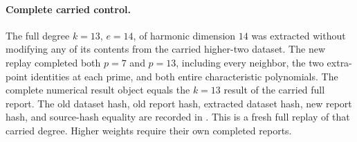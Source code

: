 \paragraph{Complete carried control.}
The full degree $k=13$, $e=14$, of harmonic dimension $14$
was extracted without modifying any of its contents from
the carried higher-two dataset.  The new replay completed
both $p=7$ and $p=13$, including every neighbor, the two
extra-point identities at each prime, and both entire
characteristic polynomials.  The complete numerical result
object equals the $k=13$ result of the carried full report.
The old dataset hash, old report hash, extracted dataset
hash, new report hash, and source-hash equality are recorded
in .
This is a fresh full replay of that carried degree.  Higher
weights require their own completed reports.
